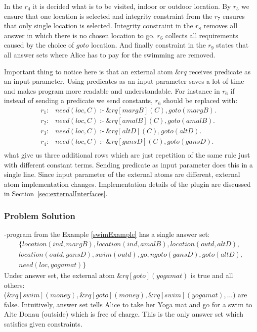 \documentclass[14pt,a4paper, titlepage]{article}
\newcommand{\ext}[3]{\ensuremath{\&{#1}[#2](#3)}}
\DeclareMathOperator{\leftimpl}{:-}
\begin{document}
In the $r_4$ it is decided what is to be visited, indoor or outdoor location. By $r_5$ we ensure that one location is selected and integrity constraint from the $r_7$ ensures that only single location is selected. Integrity constraint in the $r_8$ removes all answer in which there is no chosen location to go. $r_6$ collects all requirements caused by the choice of $\mathit{goto}$ location. And finally constraint in the $r_9$ states that all answer sets where Alice has to pay for the swimming are removed.

Important thing to notice here is that an external atom $\mathit{\&rq}$ receives predicate as an input parameter. Using predicates as an input parameter saves a lot of time and makes program more readable and understandable. For instance in $r_6$ if instead of sending a predicate we send constants, $r_6$ should be replaced with:
\begin{align*}
r_1\colon& need(loc, C) \leftimpl \ext{rq}{margB}{C}, goto(margB).\\
r_2\colon& need(loc, C) \leftimpl \ext{rq}{amalB}{C}, goto(amalB).\\
r_3\colon& need(loc, C) \leftimpl \ext{rq}{altD}{C}, goto(altD).\\
r_4\colon& need(loc, C) \leftimpl \ext{rq}{gansD}{C}, goto(gansD).\\
\end{align*}    
what give us three additional rows which are just repetition of the same rule just with different constant terms. Sending predicate as input parameter does this in a single line. Since input parameter of the external atoms are different, external atom implementation changes. Implementation details of the plugin are discussed in Section~\ref{sec:externalInterfaces}.

\subsubsection{Problem Solution}
\hex{}-program from the Example \ref{swimExample} has a single answer set:
\begin{align*}
& \{ location(ind,margB),location(ind,amalB),location(outd,altD), \\
& location(outd,gansD), swim(outd),go,ngoto(gansD),goto(altD),\\
& need(loc,yogamat) \} 
\end{align*}
Under answer set, the external atom $\ext{rq}{goto}{yogamat}$ is true and all others:\\($\ext{rq}{swim}{money}, \ext{rq}{goto}{money}, \ext{rq}{swim}{yogamat}, \dots $) are false. Intuitively, answer set tells Alice to take her Yoga mat and go for a swim to Alte Donau (outside) which is free of charge. This is the only answer set which satisfies given constraints.    
\end{document}
